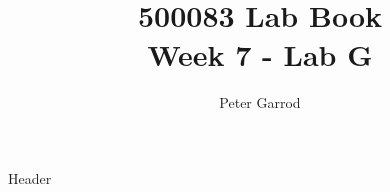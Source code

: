 \documentclass{article}
\title{%
    500083 Lab Book \\
    \large Week 7 - Lab G
    }
\author{Peter Garrod}
\begin{document}
    \maketitle
    \tableofcontents
    \newpage

    {Header}
\end{document}
